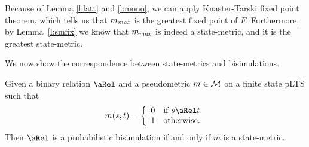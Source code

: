 \documentclass{article}
\def \CM{{\cal M}}
\begin{document}
Because of Lemma \ref{l:latt} and \ref{l:mono}, we can apply
Knaster-Tarski fixed point theorem, which tells us that $m_{\it
max}$ is the greatest fixed point of $F$. Furthermore, by
Lemma~\ref{l:smfix} we know that $m_{\it max}$ is indeed a
state-metric, and it is the greatest state-metric.


We now show the correspondence between state-metrics and
bisimulations.



\begin{theorem}\label{t:bm}
Given a binary relation $\aRel$ and a pseudometric $m\in\CM$ on a
finite state pLTS such that
\begin{equation}\label{e:rm}
m(s,t)=\left\{\begin{array}{ll}
0 & \mbox{if $s\aRel t$}\\
1 & \mbox{otherwise.}
\end{array}\right.
\end{equation}
Then $\aRel$ is a probabilistic bisimulation if and only if $m$ is a
state-metric.
\end{theorem}
\end{document}
